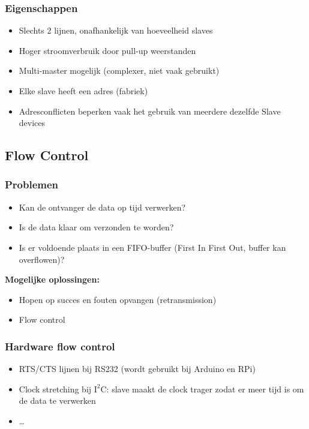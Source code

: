 \documentclass{article}
\newcommand{\bold}[1]{\textbf{#1}}
\begin{document}
\subsubsection{Eigenschappen}

\begin{itemize}
    \item Slechts 2 lijnen, onafhankelijk van hoeveelheid slaves
    \item Hoger stroomverbruik door pull-up weerstanden
    \item Multi-master mogelijk (complexer, niet vaak gebruikt)
    \item Elke slave heeft een adres (fabriek)
    \item Adresconflicten beperken vaak het gebruik van meerdere dezelfde Slave devices
\end{itemize}

\subsection{Flow Control}
\subsubsection{Problemen}
\begin{itemize}
    \item Kan de ontvanger de data op tijd verwerken?
    \item Is de data klaar om verzonden te worden?
    \item Is er voldoende plaats in een FIFO-buffer (First In First Out, buffer kan overflowen)?
\end{itemize}

\bold{Mogelijke oplossingen:}
\begin{itemize}
    \item Hopen op succes en fouten opvangen (retransmission)
    \item Flow control
\end{itemize}

\subsubsection{Hardware flow control}
\begin{itemize}
    \item RTS/CTS lijnen bij RS232 (wordt gebruikt bij Arduino en RPi)
    \item Clock stretching bij $\text{I}^2\text{C}$: slave maakt de clock trager zodat er meer tijd is om de data te verwerken
    \item \dots
\end{itemize}
\end{document}
